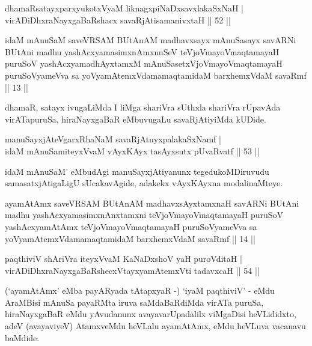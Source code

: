 \begin{shl}
dhamaRsatayxparxyukotxV\s yaM liknagxpiNaDxsavxlakaSxNaH |\\
virADiDhxraNayxgaBaRshacx savaRjAtisamanivxtaH \hfill || 52 ||
\end{shl}


\begin{kandikeshl}
idaM mAnuSaM saveVRSAM BUtAnAM madhavxsayx mAnuSasayx savARNi BUtAni madhu yashAcxyamasimxnAmxnuSeV teVjoVmayoV\s maqtamayaH puruSoV yashAcxyamadhAyxtamxM mAnuSasetxVjoVmayoV\s maqtamayaH puruSoV\s yameVva sa yoV\s yamAtemxVdamamaqtamidaM barxhemxVdaM savaRmf || 13 ||
\end{kandikeshl}


\begin{artha}
dhamaR, satayx ivugaLiMda I liMga shariVra sUthxla shariVra rUpavAda virATapuruSa, hiraNayxgaBaR eMbuvugaLu savaRjAtiyiMda kUDide.
\end{artha}

\begin{shl}
manuSayxjAteVgarxRhaNaM savaRjAtuyxpalakaSxNamf |\\
idaM mAnuSamiteyxVvaM vAyxKAyx tasAyxsutx pUvaRvatf \hfill || 53 ||
\end{shl}

\begin{artha}
idaM mAnuSaM' eMbudAgi manuSayxjAtiyanunx tegedukoMDiruvudu samasatxjAtigaLigU sUcakavAgide, adakekx vAyxKAyxna modalinaMteye.
\end{artha}


\begin{kandikeshl}
ayamAtAmx saveVRSAM BUtAnAM madhavxsAyxtamxnaH savARNi BUtAni madhu yashAcxyamasimxnAnxtamxni teVjoVmayoV\s maqtamayaH puruSoV yashAcxyamAtAmx teVjoVmayoV\s maqtamayaH puruSoV\s yameVva sa yoV\s yamAtemxVdamamaqtamidaM barxhemxVdaM savaRmf || 14 ||
\end{kandikeshl}

\begin{shl}
paqthiviV shAriVra iteyxVvaM KaNaDxshoV yaH puroVditaH |\\
virADiDhxraNayxgaBaRshecxVtayxyamAtemxVti tadavxcaH \hfill || 54 ||
\end{shl}

\begin{artha}
(`ayamAtAmx' eMba payARyada tAtapxyaR -) `iyaM paqthiviV' - eMdu   AraMBisi mAnuSa payaRMta iruva saMdaBaRdiMda virATa puruSa,   hiraNayxgaBaR eMdu yAvudanunx avayavarUpadalilx viMgaDisi   heVLididxto, adeV (avayaviyeV) AtamxveMdu heVLalu ayamAtAmx, eMdu   heVLuva vacanavu baMdide.
\end{artha}

